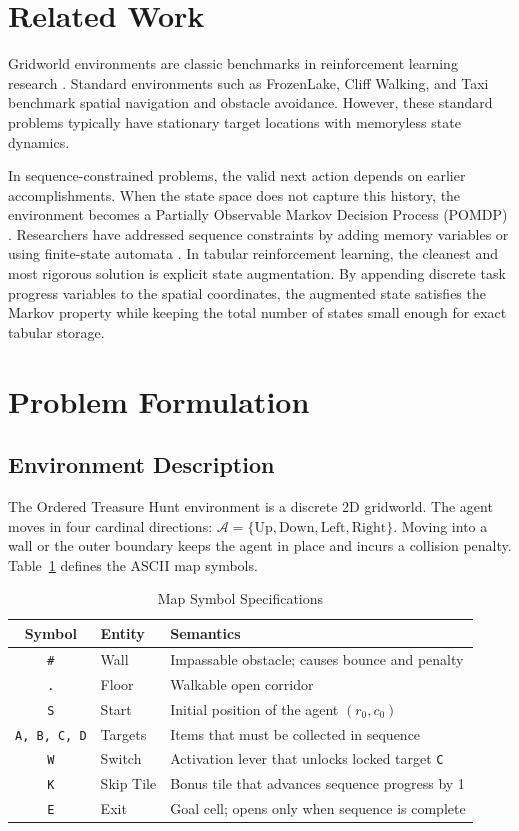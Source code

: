 \documentclass[10pt,conference]{IEEEtran}
\begin{document}
\section{Related Work}
Gridworld environments are classic benchmarks in reinforcement learning research \cite{sutton2018reinforcement}. Standard environments such as FrozenLake, Cliff Walking, and Taxi benchmark spatial navigation and obstacle avoidance. However, these standard problems typically have stationary target locations with memoryless state dynamics.

In sequence-constrained problems, the valid next action depends on earlier accomplishments. When the state space does not capture this history, the environment becomes a Partially Observable Markov Decision Process (POMDP) \cite{bertsekas2012dynamic}. Researchers have addressed sequence constraints by adding memory variables or using finite-state automata \cite{watkins1992q, rummery1994line}. In tabular reinforcement learning, the cleanest and most rigorous solution is explicit state augmentation. By appending discrete task progress variables to the spatial coordinates, the augmented state satisfies the Markov property while keeping the total number of states small enough for exact tabular storage.

\section{Problem Formulation}

\subsection{Environment Description}
The Ordered Treasure Hunt environment is a discrete 2D gridworld. The agent moves in four cardinal directions: $\mathcal{A} = \{\text{Up}, \text{Down}, \text{Left}, \text{Right}\}$. Moving into a wall or the outer boundary keeps the agent in place and incurs a collision penalty. Table~\ref{tab:symbols} defines the ASCII map symbols.

\begin{table}[htbp]
\caption{Map Symbol Specifications}
\label{tab:symbols}
\centering
\begin{tabular}{cll}
\toprule
\textbf{Symbol} & \textbf{Entity} & \textbf{Semantics} \\
\midrule
\texttt{\#} & Wall & Impassable obstacle; causes bounce and penalty \\
\texttt{.} & Floor & Walkable open corridor \\
\texttt{S} & Start & Initial position of the agent $(r_0, c_0)$ \\
\texttt{A, B, C, D} & Targets & Items that must be collected in sequence \\
\texttt{W} & Switch & Activation lever that unlocks locked target \texttt{C} \\
\texttt{K} & Skip Tile & Bonus tile that advances sequence progress by 1 \\
\texttt{E} & Exit & Goal cell; opens only when sequence is complete \\
\bottomrule
\end{tabular}
\end{table}
\end{document}
